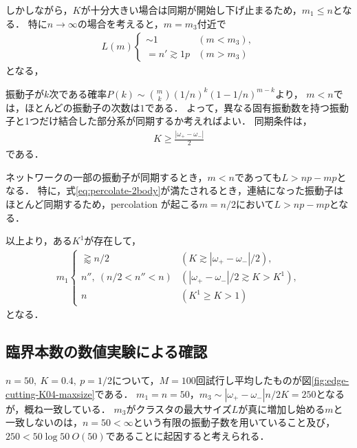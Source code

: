 \documentclass[../main]{subfiles}
\begin{document}
しかしながら，$K$が十分大きい場合は同期が開始し下げ止まるため，$m_1\leq n$となる．
特に$n\to\infty$の場合を考えると，$m=m_3$付近で
\begin{align*}
    L(m)
    \begin{cases}
        \sim 1&(m<m_3),\\        
        =n'\gtrsim  1p&(m> m_3)        
    \end{cases}
\end{align*}
となる，

振動子が$k$次である確率$P(k)\sim\binom{m}{k}(1/n)^k(1-1/n)^{m-k}$より，
$m< n$では，ほとんどの振動子の次数は$1$である．
よって，異なる固有振動数を持つ振動子と1つだけ結合した部分系が同期するか考えればよい．
同期条件は，
\begin{align}
    \label{eq:percolate-2body}
    K\geq\frac{|\omega_+-\omega_-|}{2}
\end{align}
である．

ネットワークの一部の振動子が同期するとき，$m<n$であっても$L>np-mp$となる．
特に，式\eqref{eq:percolate-2body}が満たされるとき，連結になった振動子はほとんど同期するため，percolation が起こる$m=n/2$において$L>np-mp$となる．

以上より，ある$K^1$が存在して，
\begin{align*}
    m_1
    \begin{cases}
        \gtrapprox n/2&(K \gtrsim |\omega_+-\omega_-|/2),\\        
        n'',\ (n/2<n''<n)&(|\omega_+-\omega_-|/2\gtrsim K>K^1),\\        
        n&(K^1 \geq K>1)        
    \end{cases}
\end{align*}
となる．
\subsection{臨界本数の数値実験による確認}
$n=50,\ K=0.4,\ p=1/2$について，$M=100$回試行し平均したものが図\ref{fig:edge-cutting-K04-maxsize}である．
$m_1=n=50$，$m_3\sim |\omega_+-\omega_-|n/2K=250$となるが，概ね一致している．
$m_3$がクラスタの最大サイズ$L$が真に増加し始める$m$と一致しないのは，$n=50<\infty$という有限の振動子数を用いていること及び，$250< 50\log 50\ O(50)$であることに起因すると考えられる．
\end{document}

